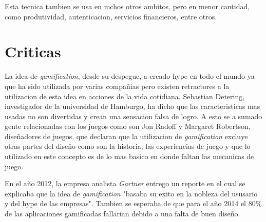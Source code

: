 Esta tecnica tambien se usa en mchos otros ambitos, pero en menor cantidad, como produtividad, 
autenticacion, servicios financieros, entre otros.

\section{Criticas}

La idea de \emph{gamification}, desde su despegue, a creado hype en todo el mundo ya que ha sido
utilizada por varias compañias pero existen retractores a la utilizacion de esta idea en acciones de la
vida cotidiana. Sebastian Detering, investigador de la universidad de Hamburgo, ha dicho que las
caracteristicas mas usadas no son divertidas y crean una sensacion falsa de logro\cite{Gam:Crit:1}.
A esto se a sumado gente relacionadas con los juegos como son Jon Radoff y Margaret Robertson, diseñadores
de juegos, que declaran que la utilizacion de \emph{gamification} excluye otras partes del diseño
como son la historia, las experiencias de juego y que lo utilizado en este concepto es de lo mas basico 
en donde faltan las mecanicas de juego\cite{Gam:Crit:2}.

En el año 2012, la empresa analista \emph{Gartner} entrego un reporte\cite{Gam:Crit:3} en el cual se 
explicaba que la idea de \emph{gamification} "basaba su exito en la nobleza del ususario y del hype
de las empresas". Tambien se esperaba de que para el año 2014 el 80$\%$ de las aplicaciones
gamificadas fallarian debido a una falta de buen diseño.

